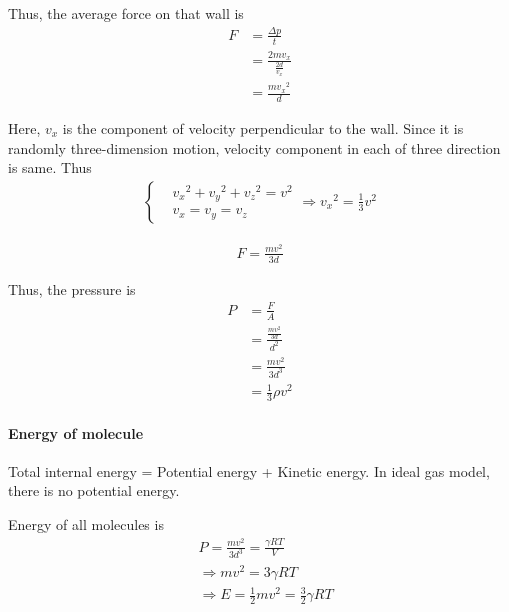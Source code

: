             Thus, the average force on that wall is
            \begin{align}
                F &= \frac{\Delta p}{t} \\
                  &= \frac{2 m v_x}{\frac{2 d}{v_x}} \\
                  &= \frac{m {v_x}^2}{d}
            \end{align}

            Here, $v_x$ is the component of velocity perpendicular to the wall. Since it is randomly three-dimension motion, velocity component in each of three direction is same. Thus
            \begin{align}
                \left\{
                    \begin{aligned}
                        & {v_x}^2 + {v_y}^2 + {v_z}^2 = v^2 \\
                        & v_x = v_y = v_z
                    \end{aligned}
                \right. \Rightarrow
                {v_x}^2 = \frac{1}{3} v^2
            \end{align}

            \begin{align}
                F = \frac{m v^2}{3 d}
            \end{align}

            Thus, the pressure is
            \begin{align}
                P &= \frac{F}{A} \\
                  &= \frac{\frac{m v^2}{3 d}}{d^2} \\
                  &= \frac{m v^2}{3 d^3} \\
                  &= \frac{1}{3} \rho v^2
            \end{align}




        \paragraph{Energy of molecule}
            Total internal energy = Potential energy + Kinetic energy. In ideal gas model, there is no potential energy.

            Energy of all molecules is
            \begin{align}
                & P = \frac{m v^2}{3 d^3} = \frac{\gamma R T}{V} \\
                & \Rightarrow m v^2 = 3 \gamma R T \\
                & \Rightarrow E = \frac{1}{2} m v^2 = \frac{3}{2} \gamma R T
            \end{align}

